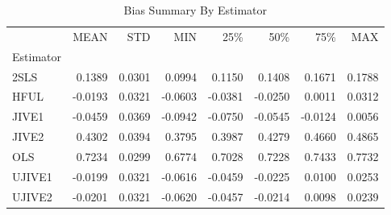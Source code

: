 \begin{table}[ht]
\centering
\caption{Bias Summary By Estimator}
\begin{tabular}{lrrrrrrr}
\toprule
 & MEAN & STD & MIN & 25\% & 50\% & 75\% & MAX \\
Estimator &  &  &  &  &  &  &  \\
\midrule
2SLS & 0.1389 & 0.0301 & 0.0994 & 0.1150 & 0.1408 & 0.1671 & 0.1788 \\
HFUL & -0.0193 & 0.0321 & -0.0603 & -0.0381 & -0.0250 & 0.0011 & 0.0312 \\
JIVE1 & -0.0459 & 0.0369 & -0.0942 & -0.0750 & -0.0545 & -0.0124 & 0.0056 \\
JIVE2 & 0.4302 & 0.0394 & 0.3795 & 0.3987 & 0.4279 & 0.4660 & 0.4865 \\
OLS & 0.7234 & 0.0299 & 0.6774 & 0.7028 & 0.7228 & 0.7433 & 0.7732 \\
UJIVE1 & -0.0199 & 0.0321 & -0.0616 & -0.0459 & -0.0225 & 0.0100 & 0.0253 \\
UJIVE2 & -0.0201 & 0.0321 & -0.0620 & -0.0457 & -0.0214 & 0.0098 & 0.0239 \\
\bottomrule
\end{tabular}
\end{table}
